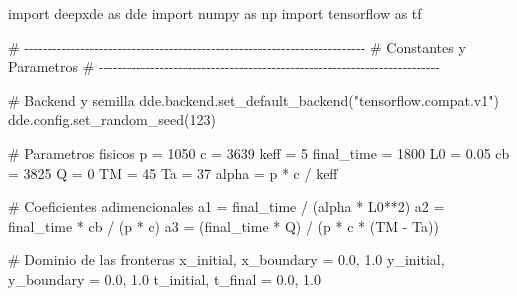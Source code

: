 \documentclass[
  spanish,
  us-letterpaper,
]{scrreprt}
\newenvironment{Shaded}{\begin{snugshade}}{\end{snugshade}}
\newcommand{\CommentTok}[1]{\textcolor[rgb]{0.37,0.37,0.37}{#1}}
\newcommand{\DecValTok}[1]{\textcolor[rgb]{0.68,0.00,0.00}{#1}}
\newcommand{\FloatTok}[1]{\textcolor[rgb]{0.68,0.00,0.00}{#1}}
\newcommand{\ImportTok}[1]{\textcolor[rgb]{0.00,0.46,0.62}{#1}}
\newcommand{\NormalTok}[1]{\textcolor[rgb]{0.00,0.23,0.31}{#1}}
\newcommand{\OperatorTok}[1]{\textcolor[rgb]{0.37,0.37,0.37}{#1}}
\newcommand{\StringTok}[1]{\textcolor[rgb]{0.13,0.47,0.30}{#1}}
\theoremstyle{definition}
\theoremstyle{plain}
\theoremstyle{remark}
\begin{document}
\begin{Shaded}
\begin{Highlighting}[]
\ImportTok{import}\NormalTok{ deepxde }\ImportTok{as}\NormalTok{ dde}
\ImportTok{import}\NormalTok{ numpy }\ImportTok{as}\NormalTok{ np}
\ImportTok{import}\NormalTok{ tensorflow }\ImportTok{as}\NormalTok{ tf}

\CommentTok{\# {-}{-}{-}{-}{-}{-}{-}{-}{-}{-}{-}{-}{-}{-}{-}{-}{-}{-}{-}{-}{-}{-}{-}{-}{-}{-}{-}{-}{-}{-}{-}{-}{-}{-}{-}{-}{-}{-}{-}{-}{-}{-}{-}{-}{-}{-}{-}{-}{-}{-}{-}{-}{-}{-}{-}{-}{-}{-}{-}{-}{-}{-}{-}{-}{-}{-}{-}{-}{-}{-}{-}{-}{-}}
\CommentTok{\# Constantes y Parametros}
\CommentTok{\# {-}{-}{-}{-}{-}{-}{-}{-}{-}{-}{-}{-}{-}{-}{-}{-}{-}{-}{-}{-}{-}{-}{-}{-}{-}{-}{-}{-}{-}{-}{-}{-}{-}{-}{-}{-}{-}{-}{-}{-}{-}{-}{-}{-}{-}{-}{-}{-}{-}{-}{-}{-}{-}{-}{-}{-}{-}{-}{-}{-}{-}{-}{-}{-}{-}{-}{-}{-}{-}{-}{-}{-}{-}}

\CommentTok{\# Backend y semilla}
\NormalTok{dde.backend.set\_default\_backend(}\StringTok{"tensorflow.compat.v1"}\NormalTok{)}
\NormalTok{dde.config.set\_random\_seed(}\DecValTok{123}\NormalTok{)}

\CommentTok{\# Parametros fisicos}
\NormalTok{p }\OperatorTok{=} \DecValTok{1050}
\NormalTok{c }\OperatorTok{=} \DecValTok{3639}
\NormalTok{keff }\OperatorTok{=} \DecValTok{5}
\NormalTok{final\_time }\OperatorTok{=} \DecValTok{1800}
\NormalTok{L0 }\OperatorTok{=} \FloatTok{0.05}
\NormalTok{cb }\OperatorTok{=} \DecValTok{3825}
\NormalTok{Q }\OperatorTok{=} \DecValTok{0}
\NormalTok{TM }\OperatorTok{=} \DecValTok{45}
\NormalTok{Ta }\OperatorTok{=} \DecValTok{37}
\NormalTok{alpha }\OperatorTok{=}\NormalTok{ p }\OperatorTok{*}\NormalTok{ c }\OperatorTok{/}\NormalTok{ keff}

\CommentTok{\# Coeficientes adimencionales}
\NormalTok{a1 }\OperatorTok{=}\NormalTok{ final\_time }\OperatorTok{/}\NormalTok{ (alpha }\OperatorTok{*}\NormalTok{ L0}\OperatorTok{**}\DecValTok{2}\NormalTok{)}
\NormalTok{a2 }\OperatorTok{=}\NormalTok{ final\_time }\OperatorTok{*}\NormalTok{ cb }\OperatorTok{/}\NormalTok{ (p }\OperatorTok{*}\NormalTok{ c)}
\NormalTok{a3 }\OperatorTok{=}\NormalTok{ (final\_time }\OperatorTok{*}\NormalTok{ Q) }\OperatorTok{/}\NormalTok{ (p }\OperatorTok{*}\NormalTok{ c }\OperatorTok{*}\NormalTok{ (TM }\OperatorTok{{-}}\NormalTok{ Ta))}

\CommentTok{\# Dominio de las fronteras}
\NormalTok{x\_initial, x\_boundary }\OperatorTok{=} \FloatTok{0.0}\NormalTok{, }\FloatTok{1.0}
\NormalTok{y\_initial, y\_boundary }\OperatorTok{=} \FloatTok{0.0}\NormalTok{, }\FloatTok{1.0}
\NormalTok{t\_initial, t\_final }\OperatorTok{=} \FloatTok{0.0}\NormalTok{, }\FloatTok{1.0}


\end{Highlighting}
\end{Shaded}
\end{document}
